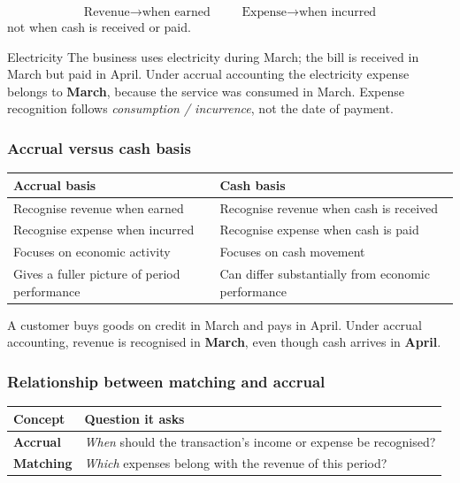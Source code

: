 \documentclass[11pt,a4paper]{article}
\begin{document}
\[
\boxed{\text{Revenue}\rightarrow\text{when earned}}\qquad\boxed{\text{Expense}\rightarrow\text{when incurred}}
\]
not when cash is received or paid.

\begin{exbox}{Electricity}
The business uses electricity during March; the bill is received in March but paid in April. Under accrual
accounting the electricity expense belongs to \textbf{March}, because the service was consumed in March. Expense
recognition follows \emph{consumption / incurrence}, not the date of payment.
\end{exbox}

\subsubsection{Accrual versus cash basis}

\begin{center}
\small
\begin{tabularx}{\textwidth}{@{}Y Y@{}}
\toprule
{}\textbf{Accrual basis} & \textbf{Cash basis}\\
\midrule
Recognise revenue when earned & Recognise revenue when cash is received\\
Recognise expense when incurred & Recognise expense when cash is paid\\
Focuses on economic activity & Focuses on cash movement\\
Gives a fuller picture of period performance & Can differ substantially from economic performance\\
\bottomrule
\end{tabularx}
\end{center}

A customer buys goods on credit in March and pays in April. Under accrual accounting, revenue is recognised in
\textbf{March}, even though cash arrives in \textbf{April}.

\subsubsection{Relationship between matching and accrual}

\begin{center}
\small
\begin{tabularx}{\textwidth}{@{}l Y@{}}
\toprule
{}\textbf{Concept} & \textbf{Question it asks}\\
\midrule
\textbf{Accrual} & \emph{When} should the transaction's income or expense be recognised?\\
\textbf{Matching} & \emph{Which} expenses belong with the revenue of this period?\\
\bottomrule
\end{tabularx}
\end{center}
\end{document}
